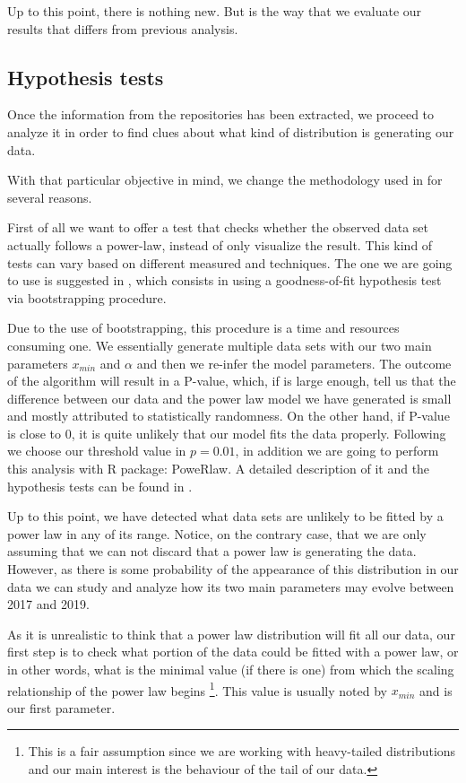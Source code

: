 \documentclass[conference]{IEEEtran}
\begin{document}
Up to this point, there is nothing new. But is the way that we evaluate our results that differs from previous analysis.

\subsection{Hypothesis tests}

Once the information from the repositories has been extracted, we
proceed to analyze it in order to find clues about what kind of distribution is generating our data. 

With that particular objective in mind, we change the methodology used
in \cite{merelo2017self} for several reasons.

First of all we want to offer a test that checks whether the observed data 
set actually follows a power-law, instead of only visualize the result. 
This kind of tests can vary based on different measured and techniques. The one we
are going to use is suggested in \cite{clauset2009power}, which consists in using a
goodness-of-fit hypothesis test via bootstrapping procedure. 

Due to the use of bootstrapping, this procedure is a time and resources consuming one.
We essentially  generate  multiple  data  sets  with our two main parameters $x_{min}$ 
and $\alpha$  and  then  we re-infer the model parameters. The outcome of the algorithm 
will result in a P-value, which, if is large enough, tell us that the difference
between our data and the power law model we have generated is small and mostly attributed
to statistically randomness. On the other hand, if P-value is close to 0, it is quite unlikely
that our model fits the data properly.
Following \cite{clauset2009power} we choose our threshold value in $p=0.01$, in addition
we are going to perform this analysis with R package: PoweRlaw. A detailed description
of it and the hypothesis tests can be found in \cite{gillespie2015power}.

Up to this point, we have detected what data sets are unlikely to be fitted by a power law
in any of its range. Notice, on the contrary case, that we are only assuming that
we can not discard that a power law is generating the data.
However, as there is some probability of the appearance of this distribution in our data
we can study and analyze how its two main parameters may evolve between 2017 and 2019.

As it is unrealistic to think that a power law distribution will
fit all our data, our first step is to check what portion of the data
could be fitted with a power law, or in other words, what is the minimal value 
(if there is one) from which the scaling relationship of the power law begins
\footnote{This is a fair assumption since we are working with heavy-tailed distributions 
	and our main interest is the behaviour of the tail of our data.}. 
This value is usually noted by $x_{min}$ and is our first parameter.
\end{document}
